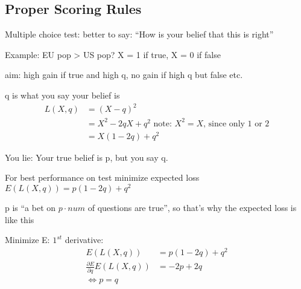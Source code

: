 \subsection{Proper Scoring Rules}
Multiple choice test: better to say: ``How is your belief that this is right''

Example: EU pop > US pop? X = 1 if true, X = 0 if false

aim: high gain if true and high q, no gain if high q but false etc.

q is what you say your belief is 
\begin{align*}
L(X,q) &= (X-q)^2 \\
       &= X^2-2qX+q^2 \mbox{ note: $X^2 = X$, since only 1 or 2} \\
       &= X(1-2q)+q^2
\end{align*}

You lie: Your true belief is p, but you say q.

For best performance on test minimize expected loss $E(L(X,q)) = p(1-2q)+q^2$

p is ``a bet on $p\cdot num$ of questions are true'', so that's why the expected loss is like this

Minimize E: $1^{st}$ derivative:
\begin{align*}
E(L(X,q)) &= p(1-2q)+q^2 \\
\frac{\partial E}{\partial q}E(L(X,q)) &= -2p + 2q \\
\Leftrightarrow p = q
\end{align*}





